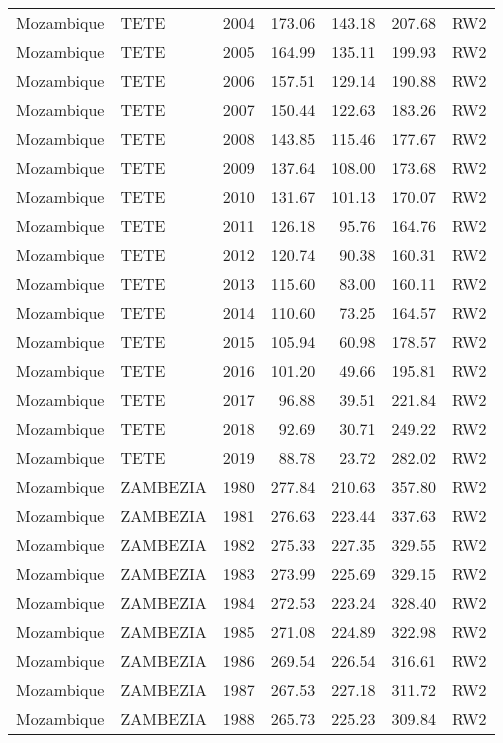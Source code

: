 \begin{longtable}{lllrrrl}
  Mozambique & TETE & 2004 & 173.06 & 143.18 & 207.68 & RW2 \\ 
  Mozambique & TETE & 2005 & 164.99 & 135.11 & 199.93 & RW2 \\ 
  Mozambique & TETE & 2006 & 157.51 & 129.14 & 190.88 & RW2 \\ 
  Mozambique & TETE & 2007 & 150.44 & 122.63 & 183.26 & RW2 \\ 
  Mozambique & TETE & 2008 & 143.85 & 115.46 & 177.67 & RW2 \\ 
  Mozambique & TETE & 2009 & 137.64 & 108.00 & 173.68 & RW2 \\ 
  Mozambique & TETE & 2010 & 131.67 & 101.13 & 170.07 & RW2 \\ 
  Mozambique & TETE & 2011 & 126.18 & 95.76 & 164.76 & RW2 \\ 
  Mozambique & TETE & 2012 & 120.74 & 90.38 & 160.31 & RW2 \\ 
  Mozambique & TETE & 2013 & 115.60 & 83.00 & 160.11 & RW2 \\ 
  Mozambique & TETE & 2014 & 110.60 & 73.25 & 164.57 & RW2 \\ 
  Mozambique & TETE & 2015 & 105.94 & 60.98 & 178.57 & RW2 \\ 
  Mozambique & TETE & 2016 & 101.20 & 49.66 & 195.81 & RW2 \\ 
  Mozambique & TETE & 2017 & 96.88 & 39.51 & 221.84 & RW2 \\ 
  Mozambique & TETE & 2018 & 92.69 & 30.71 & 249.22 & RW2 \\ 
  Mozambique & TETE & 2019 & 88.78 & 23.72 & 282.02 & RW2 \\ 
  Mozambique & ZAMBEZIA & 1980 & 277.84 & 210.63 & 357.80 & RW2 \\ 
  Mozambique & ZAMBEZIA & 1981 & 276.63 & 223.44 & 337.63 & RW2 \\ 
  Mozambique & ZAMBEZIA & 1982 & 275.33 & 227.35 & 329.55 & RW2 \\ 
  Mozambique & ZAMBEZIA & 1983 & 273.99 & 225.69 & 329.15 & RW2 \\ 
  Mozambique & ZAMBEZIA & 1984 & 272.53 & 223.24 & 328.40 & RW2 \\ 
  Mozambique & ZAMBEZIA & 1985 & 271.08 & 224.89 & 322.98 & RW2 \\ 
  Mozambique & ZAMBEZIA & 1986 & 269.54 & 226.54 & 316.61 & RW2 \\ 
  Mozambique & ZAMBEZIA & 1987 & 267.53 & 227.18 & 311.72 & RW2 \\ 
  Mozambique & ZAMBEZIA & 1988 & 265.73 & 225.23 & 309.84 & RW2 \\ 

\end{longtable}
